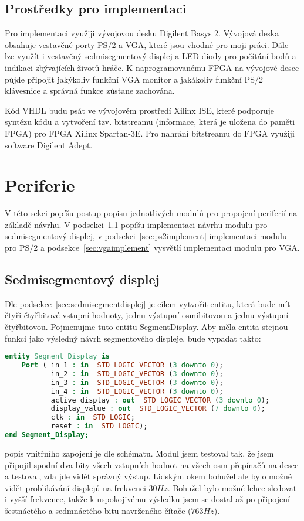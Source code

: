 \documentclass{report}
\begin{document}
\subsection{Prostředky pro implementaci}\label{sec:prostredkyproimplementaci}
Pro implementaci využiji vývojovou desku Digilent Basys 2. Vývojová deska obsahuje vestavěné porty PS/2 a VGA, které jsou vhodné pro moji práci. Dále lze využít i vestavěný sedmisegmentový displej a LED diody pro počítání bodů a indikaci zbývajících životů hráče. K naprogramovanému FPGA na vývojové desce půjde připojit jakýkoliv funkční VGA monitor a jakákoliv funkční PS/2 klávesnice a správná funkce zůstane zachována. \par
Kód VHDL budu psát ve vývojovém prostředí Xilinx ISE, které podporuje syntézu kódu a vytvoření tzv. bitstreamu (informace, která je uložena do paměti FPGA) pro FPGA Xilinx Spartan-3E. Pro nahrání bitstreamu do FPGA využiji software Digilent Adept.
\section{Periferie}
V této sekci popíšu postup popisu jednotlivých modulů pro propojení periferií na základě návrhu. V podsekci~\ref{sec:sdimplement} popíšu implementaci návrhu modulu pro sedmisegmentový displej, v podsekci~\ref{sec:ps2implement} implementaci modulu pro PS/2 a podsekce~\ref{sec:vgaimplement} vysvětlí implementaci modulu pro VGA.
\subsection{Sedmisegmentový displej}\label{sec:sdimplement}
 Dle podsekce~\ref{sec:sedmisegmentdisplej} je cílem vytvořit entitu, která bude mít čtyři čtyřbitové vstupní hodnoty, jednu výstupní osmibitovou a jednu výstupní čtyřbitovou. Pojmenujme tuto entitu Segment\textunderscore Display. Aby měla entita stejnou funkci jako výsledný návrh segmentového displeje, bude vypadat takto: 
\begin{lstlisting}[language=VHDL]
entity Segment_Display is
    Port ( in_1 : in  STD_LOGIC_VECTOR (3 downto 0);
           in_2 : in  STD_LOGIC_VECTOR (3 downto 0);
           in_3 : in  STD_LOGIC_VECTOR (3 downto 0);
           in_4 : in  STD_LOGIC_VECTOR (3 downto 0);
           active_display : out  STD_LOGIC_VECTOR (3 downto 0);
           display_value : out  STD_LOGIC_VECTOR (7 downto 0);
           clk : in  STD_LOGIC;
           reset : in  STD_LOGIC);
end Segment_Display;
\end{lstlisting}
popis vnitřního zapojení je dle schématu. Modul jsem testoval tak, že jsem připojil spodní dva bity všech vstupních hodnot na všech osm přepínačů na desce a testoval, zda jde vidět správný výstup. Lidským okem bohužel ale bylo možné vidět problikávání displejů na frekvenci $30Hz$. Bohužel bylo možné lehce sledovat i vyšší frekvence, takže k uspokojivému výsledku jsem se dostal až po připojení šestnáctého a sedmnáctého bitu navrženého čítače ($763Hz$).
\end{document}
